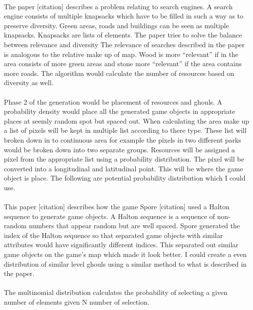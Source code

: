 \documentclass[11pt,openright,a4paper]{report}
\begin{document}
		\paragraph{}The paper [citation] describes a problem relating to search engines. A search engine consists of multiple knapsacks which have to be filled in such a way as to preserve diversity. Green areas, roads and buildings can be seen as multiple knapsacks. Knapsacks are lists of elements. The paper tries to solve the balance between relevance and diversity The relevance of searches described in the paper is analogous to the relative make up of map. Wood is more “relevant” if in the area consists of more green areas and stone more “relevant” if the area contains more roads. The algorithm would calculate the number of resources based on diversity as well. 
		
		
		\paragraph{}Phase 2 of the generation would be placement of resources and ghouls. A probability density would place all the generated game objects in appropriate places at seemly random spot but spaced out. When calculating the area make up a list of pixels will be kept in multiple list according to there type. These list will broken down in to continuous area for example the pixels in two different parks would be broken down into two separate groups. Resources will be assigned a pixel from the appropriate list using a probability distribution. The pixel will be converted into a longitudinal and latitudinal point. This will be where the game object is place. The following are potential probability distribution which I could use. 
		
		\paragraph{}This paper [citation] describes how the game Spore [citation] used a Halton sequence to generate game objects. A Halton sequence is a sequence of non-random numbers that appear random but are well spaced. Spore generated the index of the Halton sequence so that separated game objects with similar attributes would have significantly different indices. This separated out similar game objects on the game's map which made it look better. I could create a even distribution of similar level ghouls using a similar method to what is described in the paper.
		
		\paragraph{}The multinomial distribution calculates the probability of selecting a given number of elements given N number of selection. 
		
\end{document}
